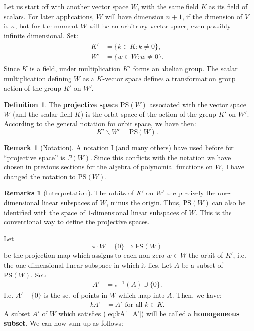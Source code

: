 \documentclass[12pt]{book}
\theoremstyle{plain}
\theoremstyle{definition}
\newtheorem{definition}{Definition}[section]
\newtheorem*{remark}{Remark}
\newtheorem*{remarks}{Remarks}
\begin{document}
Let us start off with another vector space $W$, with the same field $K$ as its field of scalars.
For later applications, $W$ will have dimension $n+1$, if the dimension of $V$ is $n$, but for the moment $W$ will be an arbitrary vector space, even possibly infinite dimensional.
Set:
\begin{align*}
\begin{split}
    K' &= \{k \in K: k \neq 0\}, \\
    W' &= \{w \in W: w \neq 0\}.
\end{split}
\end{align*}
Since $K$ is a field, under multiplication $K'$ forms an abelian group.
The scalar multiplication defining $W$ as a $K$-vector space defines a transformation group action of the group $K'$ on $W'$.

\begin{definition}
    The \textbf{projective space} $\textrm{PS}(W)$ associated with the vector space $W$ (and the scalar field $K$) is the orbit space of the action of the group $K'$ on $W'$.
    According to the general notation for orbit space, we have then:
    $$K' \backslash W' = \textrm{PS}(W).$$
\end{definition}

\begin{remark}[Notation]
    A notation I (and many others) have used before for ``projective space'' is $P(W)$.
    Since this conflicts with the notation we have chosen in previous sections for the algebra of polynomial functions on $W$, I have changed the notation to $\textrm{PS}(W)$.
\end{remark}

\begin{remarks}[Interpretation]
    The orbits of $K'$ on $W'$ are precisely the one-dimensional linear subspaces of $W$, minus the origin.
    Thus, $\textrm{PS}(W)$ can also be identified with the space of $1$-dimensional linear subspaces of $W$.
    This is the conventional way to define the projective spaces.
\end{remarks}

Let
$$\pi: W - \{0\} \to \textrm{PS}(W)$$
be the projection map which assigns to each non-zero $w \in W$ the orbit of $K'$, i.e. the one-dimensional linear subspace in which it lies.
Let $A$ be a subset of $\textrm{PS}(W)$.
Set:
\begin{align}
    A' &= \pi^{-1}(A) \cup \{0\}.
\end{align}
I.e. $A' - \{0\}$ is the set of points in $W$ which map into $A$.
Then, we have:
\begin{align} \label{eq:kA'=A'}
    kA' &= A' \text{ for all } k \in K.
\end{align}
A subset $A'$ of $W$ which satisfies (\ref{eq:kA'=A'}) will be called a \textbf{homogeneous subset}.
We can now sum up as follows:
\end{document}
